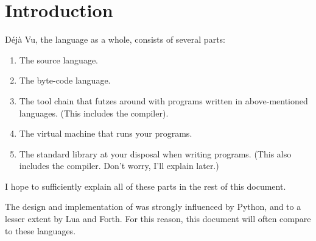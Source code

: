 \chapter{Introduction}

Déjà Vu, the language as a whole, consists of several parts:

\begin{enumerate}
\item The source language.
\item The byte-code language.
\item The tool chain that futzes around with programs written in
      above-mentioned languages. (This includes the compiler).
\item The virtual machine that runs your programs.
\item The standard library at your disposal when writing programs.
      (This also includes the compiler. Don't worry, I'll explain
      later.)
\end{enumerate}

I hope to sufficiently explain all of these parts in the rest of this
document.

\vspace{24pt}

The design and implementation of \dv{} was strongly influenced by Python, and
to a lesser extent by Lua and Forth. For this reason, this document will often
compare \dv{} to these languages.
